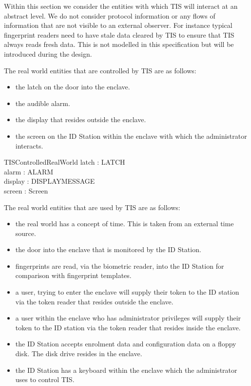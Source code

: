 Within this section we consider the entities with which TIS will
interact at an abstract level. We do not consider protocol information
or any flows of information that are not visible to an external
observer. For instance typical fingerprint readers need to have stale
data cleared by TIS to ensure that TIS always reads fresh data. This is
not modelled in this specification but will be introduced during the design.

The real world entities that are controlled by TIS are as follows:
\begin{itemize}
\item the latch on the door into the enclave.
\item the audible alarm.
\item the display that resides outside the enclave.
\item the screen on the ID Station within the enclave with
which the administrator interacts.
\end{itemize}

\begin{schema}{TISControlledRealWorld}
        latch : LATCH
\\      alarm : ALARM
\\      display : DISPLAYMESSAGE
\\      screen : Screen
\end{schema}

The real world entities that are used by TIS are as follows:
\begin{itemize}
\item the real world has a concept of time. This is taken from an
external time source.
\item the door into the enclave that is monitored by the ID Station.
\item fingerprints are read, via the biometric reader, into
the ID Station for comparison with fingerprint templates.
\item a user, trying to enter the enclave will supply
their token to the ID station via the token reader that resides
outside the enclave. 
\item a user within the enclave who has administrator
privileges will supply their token to the ID station via the token
reader that resides inside the enclave.
\item  the ID Station accepts enrolment data and
configuration data on a floppy disk. The disk drive resides in the enclave.
\item  the ID Station has a keyboard within the enclave which the
administrator uses to control TIS. 
\end{itemize}

